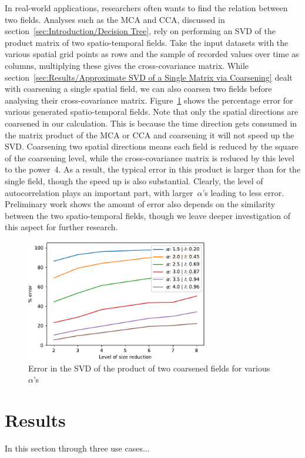 \documentclass[ijgi,article,submit,moreauthors,pdftex,10pt,a4paper]{Definitions/mdpi}
\begin{document}
In real-world applications, researchers often wants to find the relation between two fields. Analyses such as the MCA and CCA, discussed in section~\ref{sec:Introduction/Decision Tree}, rely on performing an SVD of the product matrix of two spatio-temporal fields. Take the input datasets with the various spatial grid points as rows and the sample of recorded values over time as columns, multiplying these gives the cross-covariance matrix. While section~\ref{sec:Results/Approximate SVD of a Single Matrix via Coarsening} dealt with coarsening a single spatial field, we can also coarsen two fields before analysing their cross-covariance matrix. Figure~\ref{fig:plotProductSpatialTemporalFieldsViaCoarsening} shows the percentage error for various generated spatio-temporal fields. Note that only the spatial directions are coarsened in our calculation. This is because the time direction gets consumed in the matrix product of the MCA or CCA and coarsening it will not speed up the SVD. Coarsening two spatial directions means each field is reduced by the square of the coarsening level, while the cross-covariance matrix is reduced by this level to the power~$4$. As a result, the typical error in this product is larger than for the single field, though the speed up is also substantial. Clearly, the level of autocorrelation plays an important part, with larger~$\alpha$'s leading to less error. Preliminary work shows the amount of error also depends on the similarity between the two spatio-temporal fields, though we leave deeper investigation of this aspect for further research. 

\begin{figure}[H]
\centering
\includegraphics[width=80mm]{Results/plotProductSpatialTemporalFieldsViaCoarsening.pdf}
\caption[Error after coarsening]{Error in the SVD of the product of two coarsened fields for various $\alpha$'s}
\label{fig:plotProductSpatialTemporalFieldsViaCoarsening}
\end{figure}

\section{Results}
In this section through three use cases...
\end{document}
